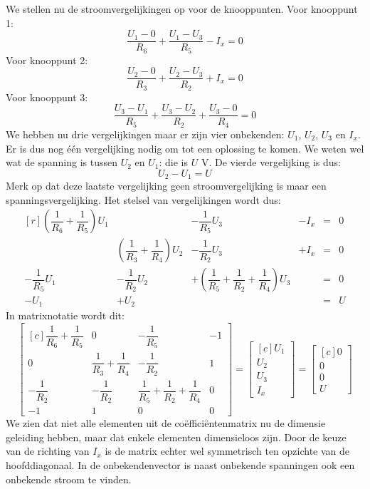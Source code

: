 We stellen nu de stroomvergelijkingen op voor de knooppunten. Voor knooppunt 1:
%
\begin{equation}
\dfrac{U_1-0}{R_6} + \dfrac{U_1-U_3}{R_5} - I_x = 0
\end{equation}
%
Voor knooppunt 2:
%
\begin{equation}
\dfrac{U_2-0}{R_3} + \dfrac{U_2-U_3}{R_2} + I_x = 0
\end{equation}
%
Voor knooppunt 3:
%
\begin{equation}
\dfrac{U_3-U_1}{R_5} + \dfrac{U_3-U_2}{R_2} + \dfrac{U_3-0}{R_4} = 0
\end{equation}
%
We hebben nu drie vergelijkingen maar er zijn vier onbekenden: $U_1$, $U_2$, $U_3$ en $I_x$. Er is dus nog één vergelijking nodig om tot een oplossing te komen. We weten wel wat de spanning is tussen $U_2$ en $U_1$: die is $U$ \si{\volt}. De vierde vergelijking is dus:
%
\begin{equation}
U_2-U_1 = U
\end{equation}
%
Merk op dat deze laatste vergelijking geen stroomvergelijking is maar een spanningsvergelijking. Het stelsel van vergelijkingen wordt dus:
%
\begin{equation}
\begin{matrix*}[r]
\left(\dfrac{1}{R_6}+\dfrac{1}{R_5}\right)U_1 & & -\dfrac{1}{R_5}U_3 & -I_x &=& 0 \\[1em]
 & \left(\dfrac{1}{R_3}+\dfrac{1}{R_4}\right)U_2 & -\dfrac{1}{R_2}U_3 & +I_x &=& 0 \\[1em]
-\dfrac{1}{R_5}U_1 & -\dfrac{1}{R_2}U_2 & +\left(\dfrac{1}{R_5}+\dfrac{1}{R_2}+\dfrac{1}{R_4}\right)U_3 & &=& 0 \\[1.5em]
-U_1 & +U_2 & & &= &U
\end{matrix*}
\end{equation}
%
In matrixnotatie wordt dit:
%
\begin{equation}
\begin{bmatrix*}[c]
\dfrac{1}{R_6}+\dfrac{1}{R_5} & 0 & -\dfrac{1}{R_5} & -1 \\[1em]
0 & \dfrac{1}{R_3}+\dfrac{1}{R_4} & -\dfrac{1}{R_2} & 1  \\[1em]
-\dfrac{1}{R_2} & -\dfrac{1}{R_2} & \dfrac{1}{R_5}+\dfrac{1}{R_2}+\dfrac{1}{R_4} & 0 \\[1.5em]
-1 & 1 & 0 & 0
\end{bmatrix*} =
\begin{bmatrix*}[c]
U_1 \\[1em] U_2\\[1em] U_3\\[1em] I_x
\end{bmatrix*} = 
\begin{bmatrix*}[c]
0 \\[1em] 0 \\[1em] 0 \\[1em] U
\end{bmatrix*}
\end{equation}
%
We zien dat niet alle elementen uit de coëfficiëntenmatrix nu de dimensie geleiding hebben, maar dat enkele elementen dimensieloos zijn. Door de keuze van de richting van $I_x$ is de matrix echter wel symmetrisch ten opzichte van de hoofddiagonaal. In de onbekendenvector is naast onbekende spanningen ook een onbekende stroom te vinden.

